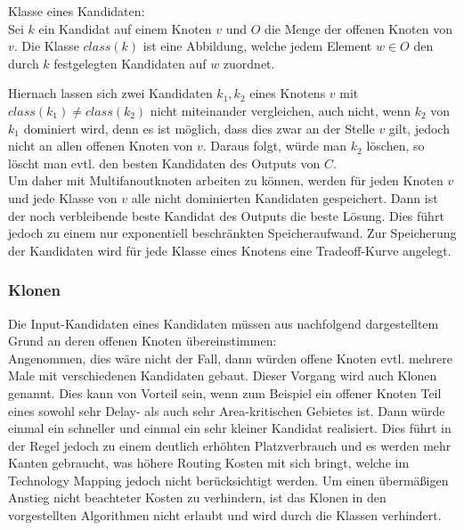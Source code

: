 \documentclass[11pt, a4paper, german]{article}
\newcommand{\TM}{Technology  Mapping }
\begin{document}
\begin{definition}{Klasse eines Kandidaten:}\\
	Sei $k$ ein Kandidat auf einem Knoten $v$ und $O$ die Menge der offenen Knoten von $v$. Die Klasse $class(k)$ ist eine Abbildung, welche jedem Element $w \in O$ den durch $k$ festgelegten Kandidaten auf $w$ zuordnet.
\end{definition}
Hiernach lassen sich zwei Kandidaten $k_1,k_2$ eines Knotens $v$ mit $class(k_1) \neq class(k_2)$ nicht miteinander vergleichen, auch nicht, wenn $k_2$ von  $k_1$ dominiert wird, denn es ist möglich, dass dies zwar an der Stelle $v$ gilt, jedoch nicht an allen offenen Knoten von $v$. Daraus folgt, würde man $k_2$ löschen, so löscht man evtl. den besten Kandidaten des Outputs von $C$. \\
Um daher mit Multifanoutknoten arbeiten zu können, werden für jeden Knoten $v$ und jede Klasse von $v$ alle nicht dominierten Kandidaten gespeichert. Dann ist der noch verbleibende beste Kandidat des Outputs die beste Lösung. Dies führt jedoch zu einem nur exponentiell beschränkten Speicheraufwand.
Zur Speicherung der Kandidaten wird für jede Klasse eines Knotens eine Tradeoff-Kurve angelegt.

\subsubsection{Klonen}\label{subsubsec:klonen}
Die Input-Kandidaten eines Kandidaten müssen aus nachfolgend dargestelltem Grund an deren offenen Knoten übereinstimmen:\\
Angenommen, dies wäre nicht der Fall, dann würden offene Knoten evtl. mehrere Male mit verschiedenen Kandidaten gebaut. Dieser Vorgang wird auch Klonen genannt. Dies kann von Vorteil sein, wenn zum Beispiel ein offener Knoten Teil eines sowohl sehr Delay- als auch sehr Area-kritischen Gebietes ist. Dann würde einmal ein schneller und einmal ein sehr kleiner Kandidat realisiert. Dies führt in der Regel jedoch zu einem deutlich erhöhten Platzverbrauch und es werden mehr Kanten gebraucht, was höhere Routing Kosten mit sich bringt, welche im \TM jedoch nicht berücksichtigt werden. Um einen übermäßigen Anstieg nicht beachteter Kosten zu verhindern, ist das Klonen in den vorgestellten Algorithmen nicht erlaubt und wird durch die Klassen verhindert. \\
\end{document}
